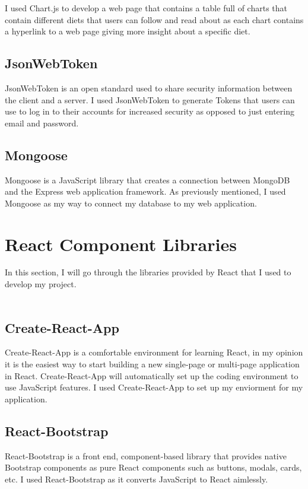 I used Chart.js to develop a web page that contains a table full of charts that contain different diets that users can follow and read about as each chart contains a hyperlink to a web page giving more insight about a specific diet.

\subsection{JsonWebToken}

JsonWebToken is an open standard used to share security information between the client and a server. I used JsonWebToken to generate Tokens that users can use to log in to their accounts for increased security as opposed to just entering email and password.

\subsection{Mongoose}

Mongoose is a JavaScript library that creates a connection between MongoDB and the Express web application framework. As previously mentioned, I used Mongoose as my way to connect my database to my web application.

\section{React Component Libraries}

In this section, I will go through the libraries provided by React that I used to develop my project.\\ \\

\subsection{Create-React-App}

Create-React-App is a comfortable environment for learning React, in my opinion it is the easiest way to start building a new single-page or multi-page application in React. Create-React-App will automatically set up the coding environment to use JavaScript features. I used Create-React-App to set up my enviorment for my application. 

\subsection{React-Bootstrap}

React-Bootstrap is a front end, component-based library that provides native Bootstrap components as pure React components such as buttons, modals, cards, etc. I used React-Bootstrap as it converts JavaScript to React aimlessly.

